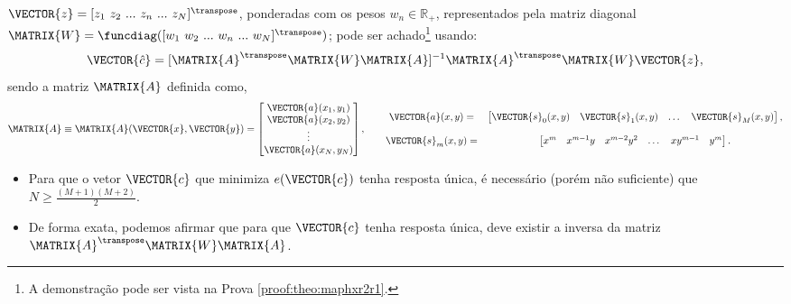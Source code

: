 \begin{theorem}
$\VECTOR{z}=[z_1~ z_2~ ...~ z_n~ ...~ z_N]^{\transpose}$,
ponderadas com os pesos $w_n \in \mathbb{R}_+$, 
representados pela matriz diagonal $\MATRIX{W}=\funcdiag([w_1~ w_2~ ...~ w_n~ ...~ w_N]^{\transpose})$;
pode ser achado\footnote{A demonstração pode ser vista na Prova \ref{proof:theo:maphxr2r1}.} usando:
\begin{equation}\label{eq:maphxr2r1:3}
\VECTOR{\hat{c}}=[\MATRIX{A}^{\transpose}\MATRIX{W}\MATRIX{A}]^{-1}\MATRIX{A}^{\transpose}\MATRIX{W}\VECTOR{z},
\end{equation}
sendo a matriz $\MATRIX{A}$ definida como,
\begin{equation}\label{eq:maphxr2r1:4}
\MATRIX{A}\equiv\MATRIX{A}(\VECTOR{x},\VECTOR{y})=\begin{bmatrix}
\VECTOR{a}(x_1,y_1)\\
\VECTOR{a}(x_2,y_2)\\
\vdots\\
\VECTOR{a}(x_N,y_N)\\
\end{bmatrix}, \qquad
\begin{matrix}
\VECTOR{a}(x,y)= &
\begin{bmatrix}
\VECTOR{s}_{0}(x,y) & \VECTOR{s}_{1}(x,y) &  \dots  & \VECTOR{s}_{M}(x,y)
\end{bmatrix},\\
~&~\\
\VECTOR{s}_{m}(x,y)=&
\begin{bmatrix}
x^m  & x^{m-1} y  & x^{m-2} y^2    & \dots  & x y^{m-1} &  y^m 
\end{bmatrix}.
\end{matrix}
\end{equation}
\end{theorem}


\begin{tcbattention}
\begin{itemize}
\item Para que o vetor $\VECTOR{c}$
que minimiza $e(\VECTOR{c})$ tenha resposta única,
é necessário (porém não suficiente) que  $N\geq \frac{(M+1)(M+2)}{2}$.
\item De forma exata, podemos afirmar que para que $\VECTOR{c}$ tenha resposta única,
deve existir a inversa da matriz $\MATRIX{A}^{\transpose}\MATRIX{W}\MATRIX{A}$.
\end{itemize}
\end{tcbattention}

